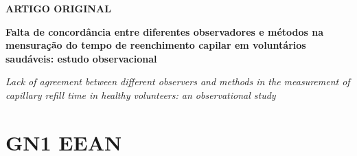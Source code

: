 \documentclass[numberinsection,times,9pt,spreadimages]{memoir}
\begin{document}
{{{{{{{\par{\zurichcondensedfont\fontsize{11}{13.2}\selectfont\textbf{ARTIGO ORIGINAL}}
\par{\adobegaramondprofont\fontsize{16}{19.2}\selectfont\textbf{Falta de concordância entre diferentes observadores e métodos na mensuração do tempo de reenchimento capilar em voluntários saudáveis: estudo observacional}
\par{\adobegaramondprofont\fontsize{14}{16.8}\selectfont\textit{Lack of agreement between different observers and methods in the measurement of capillary refill time in healthy volunteers: an observational study}
\par{\zurichlightcondensedfont\fontsize{8}{9.6}}
\par{\zurichlightcondensedfont\fontsize{8}{9.6}\selectfont{1. Serviço de Terapia Intensiva, Sanatorio Otamendi y Miroli - Buenos Aires, Argentina.}}
\par{\zurichcondensedfont\fontsize{11}{13.2}
\par{\zurichcondensedfont\fontsize{7}{8.4}\selectfont{Rev Bras Ter Intensiva. 2014;26(3):00-00}}

\newpage

\section*{GN1 EEAN}


}}}}}}}}}}
\end{document}
